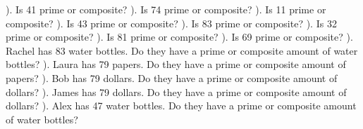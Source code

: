 \documentclass{article}%
\begin{document}
\newline%
). Is 41 prime or composite?%
\newline%
\newline%
). Is 74 prime or composite?%
\newline%
\newline%
). Is 11 prime or composite?%
\newline%
\newline%
). Is 43 prime or composite?%
\newline%
\newline%
). Is 83 prime or composite?%
\newline%
\newline%
). Is 32 prime or composite?%
\newline%
\newline%
). Is 81 prime or composite?%
\newline%
\newline%
). Is 69 prime or composite?%
\newline%
\newline%
). Rachel has 83 water bottles. Do they have a prime or composite amount of water bottles?%
\newline%
\newline%
). Laura has 79 papers. Do they have a prime or composite amount of papers?%
\newline%
\newline%
). Bob has 79 dollars. Do they have a prime or composite amount of dollars?%
\newline%
\newline%
). James has 79 dollars. Do they have a prime or composite amount of dollars?%
\newline%
\newline%
). Alex has 47 water bottles. Do they have a prime or composite amount of water bottles?%
\newline%
\end{document}
